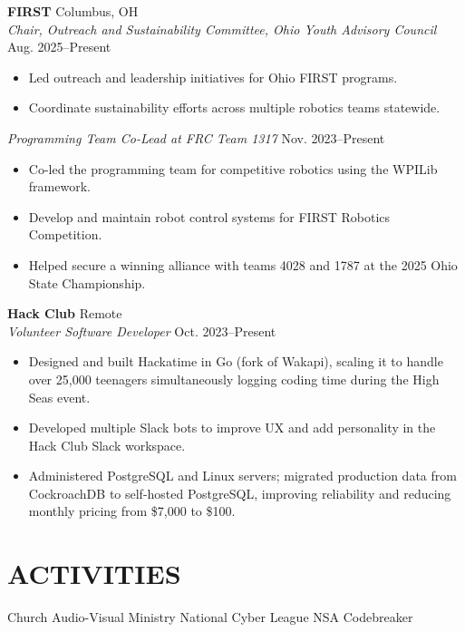 \documentclass[a4paper,10pt]{article}
\newlength{\mpwidth}
\begin{document}
\textbf{FIRST} \hfill Columbus, OH\\
\textit{Chair, Outreach and Sustainability Committee, Ohio Youth Advisory Council} \hfill Aug. 2025--Present
\begin{minipage}{\mpwidth}
\begin{itemize}[nosep,after=\strut, leftmargin=1em, itemsep=3pt,label=--]
\item Led outreach and leadership initiatives for Ohio FIRST programs.
\item Coordinate sustainability efforts across multiple robotics teams statewide.
\end{itemize}
\end{minipage}

\textit{Programming Team Co-Lead at FRC Team 1317} \hfill Nov. 2023--Present
\begin{minipage}{\mpwidth}
\begin{itemize}[nosep,after=\strut, leftmargin=1em, itemsep=3pt,label=--]
\item Co-led the programming team for competitive robotics using the WPILib framework.
\item Develop and maintain robot control systems for FIRST Robotics Competition.
\item Helped secure a winning alliance with teams 4028 and 1787 at the 2025 Ohio State Championship.
\end{itemize}
\end{minipage}

\textbf{Hack Club} \hfill Remote\\
\textit{Volunteer Software Developer} \hfill Oct. 2023--Present
\begin{minipage}{\mpwidth}
\begin{itemize}[nosep,after=\strut, leftmargin=1em, itemsep=3pt,label=--]
\item Designed and built Hackatime in Go (fork of Wakapi), scaling it to handle over 25,000 teenagers simultaneously logging coding time during the High Seas event.
\item Developed multiple Slack bots to improve UX and add personality in the Hack Club Slack workspace.
\item Administered PostgreSQL and Linux servers; migrated production data from CockroachDB to self-hosted PostgreSQL, improving reliability and reducing monthly pricing from \$7,000 to \$100.
\end{itemize}
\end{minipage}

\section{ACTIVITIES}
\begin{center}
{\small Church Audio-Visual Ministry \textbar{} National Cyber League \textbar{} NSA Codebreaker}
\end{center}

\vfill
\end{document}
